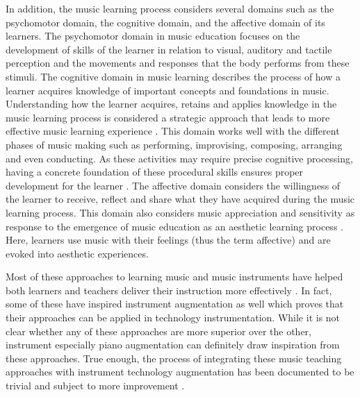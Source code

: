 \documentclass[sigconf, screen, review]{acmart}
\begin{document}
In addition, the music learning process considers several domains such as the psychomotor domain, the cognitive domain, and the affective domain of its learners. The psychomotor domain in music education focuses on the development of skills of the learner in relation to visual, auditory and tactile perception \cite{simpson1966classification} and the movements and responses that the body performs from these stimuli. The cognitive domain in music learning describes the process of how a learner acquires knowledge of important concepts and foundations in music. Understanding how the learner acquires, retains and applies knowledge in the music learning process is considered a strategic approach that leads to more effective music learning experience \cite{hanna2007new}. This domain works well with the different phases of music making such as performing, improvising, composing, arranging and even conducting. As these activities may require precise cognitive processing, having a concrete foundation of these procedural skills ensures proper development for the learner \cite{westerlund2003reconsidering}. The affective domain considers the willingness of the learner to receive, reflect and share what they have acquired during the music learning process. This domain also considers music appreciation and sensitivity as response to the emergence of music education as an aesthetic learning process \cite{mccarthy2002music}. Here, learners use music with their feelings (thus the term affective) and are evoked into aesthetic experiences. 

Most of these approaches to learning music and music instruments have helped both learners and teachers deliver their instruction more effectively \cite{burns2020using}. In fact, some of these have inspired instrument augmentation as well \cite{howard1996kodaly, burns2020using, blackshaw2020wearing, anggoro2020study, comeau2012playing} which proves that their approaches can be applied in technology instrumentation. While it is not clear whether any of these approaches are more superior over the other, instrument especially piano augmentation can definitely draw inspiration from these approaches. True enough, the process of integrating these music teaching approaches with instrument technology augmentation has been documented to be trivial and subject to more improvement \cite{beckstead2001will}. 
\end{document}
